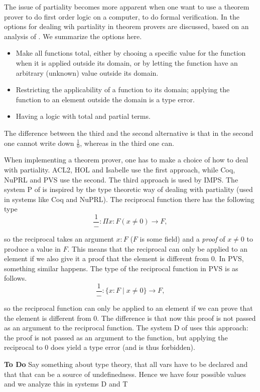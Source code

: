 \documentclass{article}
\newcommand{\D}{\textsf D}
\newcommand{\PP}{\textsf P}
\newcommand{\T}{\textsf T}
\begin{document}
The issue of partiality becomes more apparent when one want to use a
theorem prover to do first order logic on a computer, to do formal
verification. In \cite{wie:zwa:03} the options for dealing wih
partiality in theorem provers are discussed, based on an analysis of
\cite{harrison}. We summarize the options here.
\begin{itemize}
\item Make all functions total, either by chooing a specific 
value for the function when it is applied outside its domain, or by
letting the function have an arbitrary (unknown) value outside its
domain.
\item Restricting the applicability of a function to its domain; 
applying the function to an element outside the domain is a type
error.
\item Having a logic with total and partial terms.
\end{itemize}
The difference between the third and the second alternative is that in
the second one cannot write down $\frac{1}{0}$, whereas in the third
one can.

When implementing a theorem prover, one has to make a choice of how to
deal with partiality. ACL2, HOL and Isabelle use the first approach,
while Coq, NuPRL and PVS use the second. The third approach is used by
IMPS. The system {\PP} of \cite{wie:zwa:03} is inspired by the type
theoretic way of dealing with partiality (used in systems like Coq and
NuPRL). The reciprocal function there has the following type
$$\frac{1}{-} : \Pi x{:}F (x\neq 0) \rightarrow F,$$ 

so the reciprocal takes an argument $x:F$ ($F$ is some field) and a
{\em proof\/} of $x\neq 0$ to produce a value in $F$. This means that
the reciprocal can only be applied to an element if we also give it a
proof that the element is different from $0$. In PVS, something
similar happens. The type of the reciprocal function in PVS is as
follows.  
$$\frac{1}{-} : \{x{:}F \mid x\neq 0\} \rightarrow F,$$

so the reciprocal function can only be applied to an element if we can
prove that the element is different from $0$. The difference is that
now this proof is not passed as an argument to the reciprocal
function. The system {\D} of \cite{wie:zwa:03} uses this approach: the
proof is not passed as an argument to the function, but applying the
reciprocal to $0$ does yield a type error (and is thus forbidden).

{\bf To Do} Say something about type theory, that all vars have to be declared and that that can be  a source of undefinedness. Hence we have four possible values and we analyze this in systems {\D} and {\T}
\end{document}
